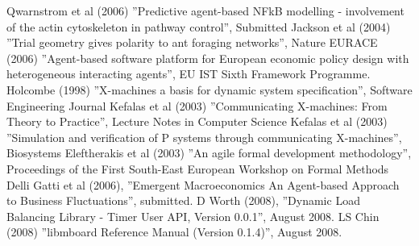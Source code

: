 \begin{thebibliography}{99}
 Qwarnstrom et al (2006) ''Predictive agent-based NFkB modelling - involvement of the actin cytoskeleton in pathway control'', Submitted
 Jackson et al (2004) ''Trial geometry gives polarity to ant foraging networks'', Nature
 EURACE (2006)  ''Agent-based software platform for European economic policy design with heterogeneous interacting agents'', EU IST Sixth Framework Programme.
 Holcombe (1998) ''X-machines a basis for dynamic system specification'', Software Engineering Journal
 Kefalas et al (2003) ''Communicating X-machines: From Theory to Practice'', Lecture Notes in Computer Science
 Kefalas et al (2003) ''Simulation and verification of P systems through communicating X-machines'', Biosystems
 Eleftherakis et al (2003) ''An agile formal development methodology'', Proceedings of the First South-East European Workshop on Formal Methods
 Delli Gatti et al (2006), ''Emergent Macroeconomics An Agent-based Approach to Business Fluctuations'', submitted.
 D Worth (2008), ''Dynamic Load Balancing Library - Timer User API, Version 0.0.1'', August 2008.
 LS Chin (2008)  ''libmboard Reference Manual (Version 0.1.4)'', August 2008.
\end{thebibliography}
